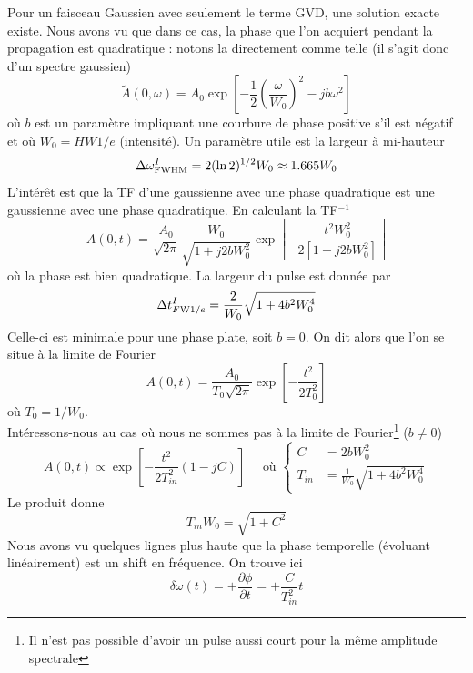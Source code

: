 	Pour un faisceau Gaussien avec seulement le terme GVD, une solution exacte existe. Nous avons vu
	que dans ce cas, la phase que l'on acquiert pendant la propagation  est quadratique : notons la
	directement comme telle (il s'agit donc d'un spectre gaussien)
	\begin{equation}
	\tilde A(0,\omega ) = {A_0}\exp \left[ { - \frac{1}{2}{{(\frac{\omega }{{{W_0}}})}^2} - jb{\omega ^2}} \right]
	\end{equation}
	où $b$ est un paramètre impliquant une courbure de phase positive s'il est négatif et 
	où $W_0 = HW1/e$ (intensité). Un paramètre utile est la largeur à mi-hauteur
	\begin{equation}
	\Delta \omega _{{\rm{FWHM}}}^{I} = 2{(\ln 2)^{1/2}}{W_0} \approx 1.665{W_0}
	\end{equation}
	L'intérêt est que la TF d'une gaussienne avec une phase quadratique est une
	gaussienne avec une phase quadratique. En calculant la TF$^{-1}$
	\begin{equation}
	A(0,t) = \frac{{{A_0}}}{{\sqrt {2\pi } }}\frac{{{W_0}}}{{\sqrt {1 + j2bW_0^2} }}\exp \left[ { - \frac{{{t^2}W_0^2}}{{2[1 + j2bW_0^2]}}} \right]
	\end{equation}
	où la phase est bien quadratique. La largeur du pulse est donnée par
	\begin{equation}
	\Delta t_{F{\rm{W}}1/e}^{I} = \frac{2}{{{W_0}}}\sqrt {1 + 4{b^2}W_0^4} 
	\end{equation}
	Celle-ci est minimale pour une phase plate, soit $b=0$. On dit alors que l'on se situe à la 
	limite de Fourier
	\begin{equation}
	A(0,t) = \frac{{{A_0}}}{{{T_0}\sqrt {2\pi } }}\exp \left[ { - \frac{{{t^2}}}{{2T_0^2}}} \right]
	\end{equation}
	où $T_0=1/W_0$.\\
	
	Intéressons-nous au cas où nous ne sommes pas à la limite de Fourier\footnote{Il n'est pas 
	possible d'avoir un pulse aussi court pour la même amplitude spectrale} ($b\neq0$)
	\begin{equation}
	A(0,t) \propto \exp [ - \frac{{{t^2}}}{{2T_{in}^2}}(1 - jC)]\quad\text{ où } \left\{\begin{array}{ll}
	C &= 2bW_0^2\\
	{T_{in}} &= \frac{1}{{{W_0}}}\sqrt {1 + 4{b^2}W_0^4} 
	\end{array}\right.
	\end{equation}
	Le produit donne
	\begin{equation}
	{T_{in}}{W_0} = \sqrt {1 + {C^2}} 
	\end{equation}
	Nous avons vu quelques lignes plus haute que la phase temporelle (évoluant linéairement) est
	un shift en fréquence. On trouve ici
	\begin{equation}
	\delta \omega (t) =  + \frac{{\partial \phi }}{{\partial t}} =  + \frac{C}{{T_{in}^2}}t
	\end{equation}
	
